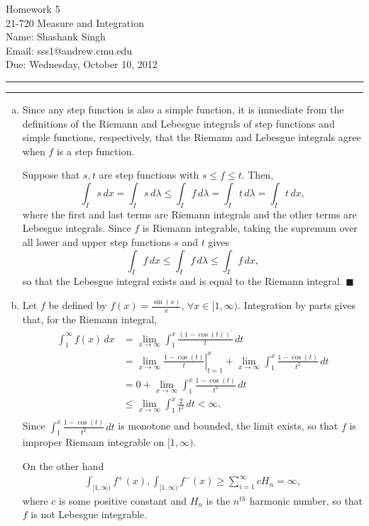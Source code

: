\documentclass[11pt]{article}
\makeatletter
\newcounter{questionCounter}
\newcounter{partCounter}[questionCounter]
\newenvironment{question}[2][\arabic{questionCounter}]{%
    \setcounter{partCounter}{0}%
    \vspace{.25in} \hrule \vspace{0.5em}%
        \noindent{\bf #2}%
    \vspace{0.8em} \hrule \vspace{.10in}%
    \addtocounter{questionCounter}{1}%
}{}
\newcommand{\myname}{Shashank Singh}
\newcommand{\myandrew}{sss1@andrew.cmu.edu}
\newcommand{\myclass}{21-720 Measure and Integration}
\newcommand{\myhwnum}{5}
\newcommand{\duedate}{Wednesday, October 10, 2012}
\renewcommand{\qed}{\quad $\blacksquare$}
\makeatother
\begin{document}
\thispagestyle{plain}

{\Large Homework \myhwnum} \\
\myclass \\
Name: \myname \\
Email: \myandrew \\
Due: \duedate \\

\begin{question}{Problem 1}
\begin{enumerate}[(a)]
\item Since any step function is also a simple function, it is immediate from
the definitions of the Riemann and Lebesgue integrals of step functions and
simple functions, respectively, that the Riemann and Lebesgue integrals agree
when $f$ is a step function.

Suppose that $s,t$ are step functions with $s \leq f \leq t$. Then,
\[\int_I s \, dx
 =    \int_I s \, d\lambda
 \leq \int_I f \, d\lambda
 =    \int_I t \, d\lambda
 =    \int_I t \, dx,
\]
where the first and last terms are Riemann integrals and the other terms are
Lebesgue integrals.
Since $f$ is Riemann integrable, taking the supremum over all lower and upper
step functions $s$ and $t$ gives
\[\int_I f \, dx
 \leq \int_I f \, d\lambda
 \leq \int_I f \, dx,
\]
so that the Lebesgue integral exists and is equal to the Riemann integral.
\qed

\item Let $f$ be defined by $f(x) = \frac{\sin(x)}{x}$,
$\forall x \in [1,\infty)$. Integration by parts gives that, for the Riemann
integral,
\begin{align*}
\int_1^{\infty} f(x) \, dx
 & =    \lim_{x \rightarrow \infty} \int_1^x \frac{(1 - \cos(t))^{\prime}}{t} \, dt \\
 & =    \lim_{x \rightarrow \infty} \left. \frac{1 - \cos(t)}{t} \right|_{t = 1}^x + \lim_{x \rightarrow \infty} \int_1^x \frac{1 - \cos(t)}{t^2} \, dt \\
 & =    0 + \lim_{x \rightarrow \infty} \int_1^x \frac{1 - \cos(t)}{t^2} \, dt \\
 & \leq \lim_{x \rightarrow \infty} \int_1^x \frac{2}{t^2} \, dt < \infty. \\
\end{align*}
Since $\int_1^x \frac{1 - \cos(t)}{t^2} \, dt$ is monotone and bounded, the limit
exists, so that $f$ is improper Riemann integrable on $[1,\infty)$.

On the other hand
\begin{align*}
\int_{[1,\infty)} f^+(x), \int_{[1,\infty)} f^-(x) \geq \sum_{i = 1}^{\infty} cH_n = \infty,
\end{align*}
where $c$ is some positive constant and $H_n$ is the $n^{th}$ harmonic number,
so that $f$ is not Lebesgue integrable.

\end{enumerate}
\end{question}
\end{document}
